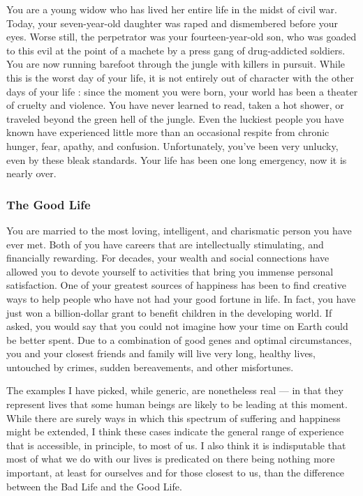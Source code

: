 \documentclass[a4paper,14pt]{extbook}
\begin{document}
You are a young widow who has lived her entire life in the midst of civil war.
Today, your seven-year-old daughter was raped and dismembered before your eyes.
Worse still, the perpetrator was your fourteen-year-old son, who was goaded to this evil at the point of a machete by a press gang of drug-addicted soldiers.
You are now running barefoot through the jungle with killers in pursuit.
While this is the worst day of your life, it is not entirely out of character with the other days of your life :
since the moment you were born, your world has been a theater of cruelty and violence.
You have never learned to read, taken a hot shower, or traveled beyond the green hell of the jungle.
Even the luckiest people you have known have experienced little more than an occasional respite from chronic hunger, fear, apathy, and confusion.
Unfortunately, you've been very unlucky, even by these bleak standards.
Your life has been one long emergency, now it is nearly over.

\subsubsection{The Good Life}

You are married to the most loving, intelligent, and charismatic person you have ever met.
Both of you have careers that are intellectually stimulating, and financially rewarding.
For decades, your wealth and social connections have allowed you to devote yourself to activities that bring you immense personal satisfaction.
One of your greatest sources of happiness has been to find creative ways to help people who have not had your good fortune in life.
In fact, you have just won a billion-dollar grant to benefit children in the developing world.
If asked, you would say that you could not imagine how your time on Earth could be better spent.
Due to a combination of good genes and optimal circumstances, you and your closest friends and family will live very long, healthy lives, untouched by crimes, sudden bereavements, and other misfortunes.

The examples I have picked, while generic, are nonetheless real --- in that they represent lives that some human beings are likely to be leading at this moment.
While there are surely ways in which this spectrum of suffering and happiness might be extended, I think these cases indicate the general range of experience that is accessible, in principle, to most of us.
I also think it is indisputable that most of what we do with our lives is predicated on there being nothing more important, at least for ourselves and for those closest to us, than the difference between the Bad Life and the Good Life.
\end{document}
